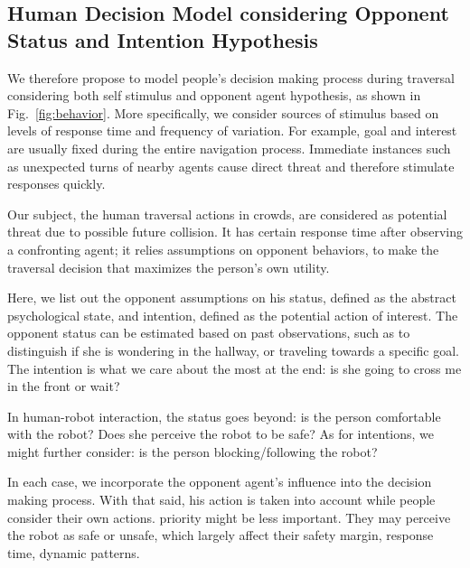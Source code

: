 \documentclass[conference]{IEEEtran}
\begin{document}
\subsection{Human Decision Model considering Opponent Status and Intention Hypothesis}
We therefore propose to model people's decision making process during 
traversal considering both self stimulus and opponent agent hypothesis, as 
shown in Fig.~\ref{fig:behavior}. More specifically, we consider sources of 
stimulus based on levels of response time and frequency of variation. For 
example, goal and interest are usually fixed during the entire navigation 
process. Immediate instances such as unexpected turns of nearby agents cause 
direct threat and therefore stimulate responses quickly.

Our subject, the human traversal actions in crowds, are considered as potential 
threat due to possible future collision. It has certain response time after 
observing a confronting agent; it relies assumptions on 
opponent behaviors, to make the traversal decision that maximizes the person's 
own utility. 

Here, we list out the opponent assumptions on his status, defined as the 
abstract psychological state, and intention, defined as the potential 
action of interest. The opponent status can be estimated based on past 
observations, such as to distinguish if she is wondering in the hallway, or 
traveling towards a specific goal. The intention is what we care about the most at 
the end: is she going to cross me in the front or wait?

In human-robot interaction, the status goes beyond: is the person comfortable 
with the robot? Does she perceive the robot 
to be safe? As for intentions, we might further consider: is the person 
blocking/following the robot? 

In each case, we incorporate the opponent agent's influence into the decision 
making process. With that said, his action is taken into account while people 
consider their own actions. 
priority might be less important. They may perceive the robot as safe or 
unsafe, which largely affect their safety margin, response time, dynamic patterns.

\vspace{-.3em}
\end{document}
